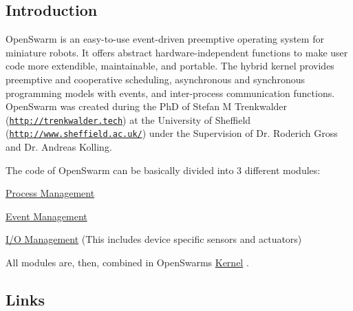 \hypertarget{index_intro_sec}{}\subsection{Introduction}\label{index_intro_sec}
Open\+Swarm is an easy-\/to-\/use event-\/driven preemptive operating system for miniature robots. It offers abstract hardware-\/independent functions to make user code more extendible, maintainable, and portable. The hybrid kernel provides preemptive and cooperative scheduling, asynchronous and synchronous programming models with events, and inter-\/process communication functions. ~\newline
~\newline
 Open\+Swarm was created during the Ph\+D of Stefan M Trenkwalder (\href{http://trenkwalder.tech}{\tt http\+://trenkwalder.\+tech}) at the University of Sheffield (\href{http://www.sheffield.ac.uk/}{\tt http\+://www.\+sheffield.\+ac.\+uk/}) under the Supervision of Dr. Roderich Gross and Dr. Andreas Kolling.

The code of Open\+Swarm can be basically divided into 3 different modules\+:
\begin{DoxyItemize}
\item \hyperlink{group__process}{Process Management}
\item \hyperlink{group__events}{Event Management}
\item \hyperlink{group__io}{I/\+O Management} (This includes device specific sensors and actuators)
\end{DoxyItemize}

All modules are, then, combined in Open\+Swarm\textquotesingle{}s \hyperlink{group__base}{Kernel} .

\hypertarget{index_link_sec}{}\subsection{Links}\label{index_link_sec}

